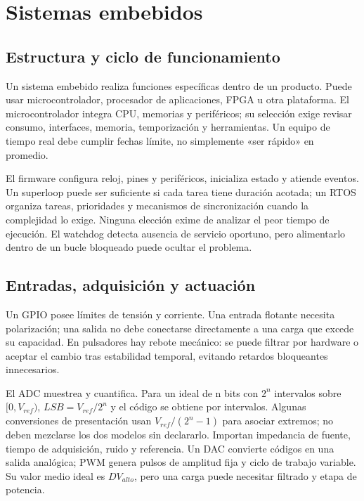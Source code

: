 
\section{Sistemas embebidos}\label{sec:h3}
\subsection{Estructura y ciclo de funcionamiento}
Un sistema embebido realiza funciones específicas dentro de un producto. Puede usar microcontrolador, procesador de aplicaciones, FPGA u otra plataforma. El microcontrolador integra CPU, memorias y periféricos; su selección exige revisar consumo, interfaces, memoria, temporización y herramientas. Un equipo de tiempo real debe cumplir fechas límite, no simplemente «ser rápido» en promedio.

El firmware configura reloj, pines y periféricos, inicializa estado y atiende eventos. Un superloop puede ser suficiente si cada tarea tiene duración acotada; un RTOS organiza tareas, prioridades y mecanismos de sincronización cuando la complejidad lo exige. Ninguna elección exime de analizar el peor tiempo de ejecución. El watchdog detecta ausencia de servicio oportuno, pero alimentarlo dentro de un bucle bloqueado puede ocultar el problema.

\subsection{Entradas, adquisición y actuación}
Un GPIO posee límites de tensión y corriente. Una entrada flotante necesita polarización; una salida no debe conectarse directamente a una carga que excede su capacidad. En pulsadores hay rebote mecánico: se puede filtrar por hardware o aceptar el cambio tras estabilidad temporal, evitando retardos bloqueantes innecesarios.

El ADC muestrea y cuantifica. Para un ideal de n bits con $2^n$ intervalos sobre $[0,V_{ref})$, $LSB=V_{ref}/2^n$ y el código se obtiene por intervalos. Algunas conversiones de presentación usan $V_{ref}/(2^n-1)$ para asociar extremos; no deben mezclarse los dos modelos sin declararlo. Importan impedancia de fuente, tiempo de adquisición, ruido y referencia. Un DAC convierte códigos en una salida analógica; PWM genera pulsos de amplitud fija y ciclo de trabajo variable. Su valor medio ideal es $D V_{alto}$, pero una carga puede necesitar filtrado y etapa de potencia.

